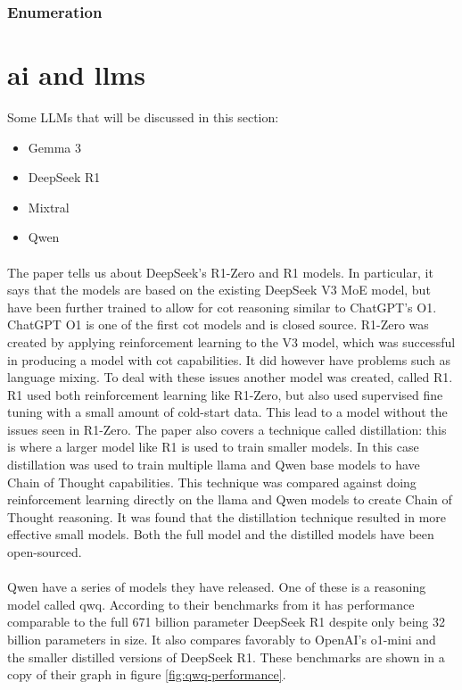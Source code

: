 \subsubsection{Enumeration}

\section{\acrlong{ai} and \acrlong{llm}s}
Some LLMs that will be discussed in this section:

\begin{itemize}
\item{Gemma 3}
\item{DeepSeek R1}
\item{Mixtral}
\item{Qwen}
\end{itemize}

\paragraph{} The paper \textcite{deepseek-ai_deepseek-r1_2025} tells us about DeepSeek's R1-Zero and  R1 models. In particular, it says that the models are based on the existing DeepSeek V3 MoE model, but have been further trained to allow for \acrfull{cot} reasoning similar to ChatGPT's O1. ChatGPT O1 is one of the first \acrshort{cot} models and is closed source. R1-Zero was created by applying reinforcement learning to the V3 model, which was successful in producing a model with \acrshort{cot} capabilities. It did however have problems such as language mixing. To deal with these issues another model was created, called R1. R1 used both reinforcement learning like R1-Zero, but also used supervised fine tuning with a small amount of cold-start data. This lead to a model without the issues seen in R1-Zero. The paper also covers a technique called distillation: this is where a larger model like R1 is used to train smaller models. In this case distillation was used to train multiple \acrshort{llama} and Qwen base models to have Chain of Thought capabilities. This technique was compared against doing reinforcement learning directly on the \acrshort{llama} and Qwen models to create Chain of Thought reasoning. It was found that the distillation technique resulted in more effective small models. Both the full model and the distilled models have been open-sourced.

\paragraph{}Qwen have a series of models they have released. One of these is a reasoning model called qwq. According to their benchmarks from \textcite{} it has performance comparable to the full 671 billion parameter DeepSeek R1 despite only being 32 billion parameters in size. It also compares favorably to OpenAI's o1-mini and the smaller distilled versions of DeepSeek R1. These benchmarks are shown in a copy of their graph in figure \ref{fig:qwq-performance}.

